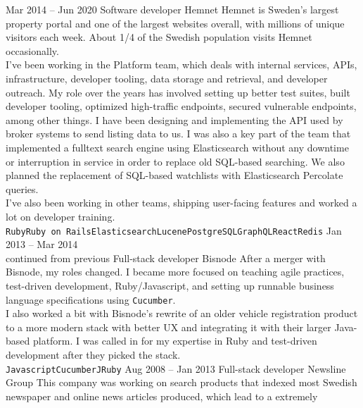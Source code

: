 \documentclass[9pt]{developercv} %
\begin{document}
\begin{entrylist}
  \entry
    {Mar 2014 -- Jun 2020}
    {Software developer}
    {Hemnet}
    {Hemnet is Sweden's largest property portal and one of the largest websites
      overall, with millions of unique visitors each week. About 1/4 of the
      Swedish population visits Hemnet occasionally.\\ I've been working in the
      Platform team, which deals with internal services, APIs, infrastructure,
      developer tooling, data storage and retrieval, and developer outreach. My
      role over the years has involved setting up better test suites, built
      developer tooling, optimized high-traffic endpoints, secured vulnerable
      endpoints, among other things. I have been designing and implementing the
      API used by broker systems to send listing data to us. I was also a key
      part of the team that implemented a fulltext search engine using
      Elasticsearch without any downtime or interruption in service in order to
      replace old SQL-based searching. We also planned the replacement of
      SQL-based watchlists with Elasticsearch Percolate queries.\\ I've also
      been
      working in other teams, shipping user-facing features and worked a lot on
      developer training.\\
      \texttt{Ruby}\slashsep\texttt{Ruby on Rails}\slashsep\texttt{Elasticsearch}\slashsep\texttt{Lucene}\slashsep\texttt{PostgreSQL}\slashsep\texttt{GraphQL}\slashsep\texttt{React}\slashsep\texttt{Redis}}
  \entry
    {Jan 2013 -- Mar 2014\\\footnotesize{continued from previous}}
    {Full-stack developer}
    {Bisnode}
    {After a merger with Bisnode, my roles changed. I became more focused on
      teaching agile practices, test-driven development, Ruby/Javascript, and
      setting up runnable business language specifications using
      \texttt{Cucumber}.\\ I also worked a bit with Bisnode's rewrite of an
      older vehicle registration product to a more modern stack with better
      UX and integrating it with their larger Java-based platform. I was called
      in for my expertise in Ruby and test-driven development after they picked
      the stack.\\
      \texttt{Javascript}\slashsep\texttt{Cucumber}\slashsep\texttt{JRuby}}
  \entry
    {Aug 2008 -- Jan 2013}
    {Full-stack developer}
    {Newsline Group}
    {This company was working on search products that indexed most Swedish
      newspaper and online news articles produced, which lead to a extremely
}
\end{entrylist}
\end{document}
